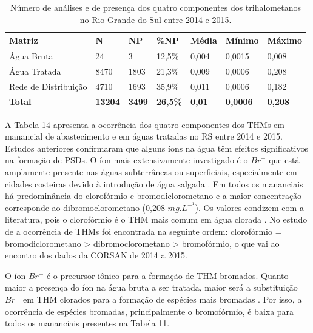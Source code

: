 \begin{table}[!htb]
\centering
\small
\caption{\small Número de análises e de presença dos quatro componentes dos trihalometanos  no Rio Grande do Sul entre 2014 e 2015.}
\label{tab:com_esp}
    \begin{tabular}{p{3.3cm}p{0.9cm}p{0.9cm}p{1cm}p{1cm}p{1.2cm}p{1.2cm}}
    \toprule
    \textbf{Matriz} & \textbf{N} & \textbf{NP}& \textbf {\%NP}&\textbf{Média} & \textbf{Mínimo} &\textbf{Máximo}\\ \hline
      Água Bruta   & 24 & 3 & 12,5\% & 0,004 & 0,0015 & 0,008 \\
      Água Tratada & 8470 & 1803 & 21,3\% & 0,009 & 0,0006 & 0,208\\
      Rede de Distribuição & 4710 & 1693 & 35,9\% & 0,011 & 0,0006 & 0,182\\ \hline
      \textbf{Total} & \textbf{13204} & \textbf{3499} & \textbf{26,5\%} & \textbf{0,01} & \textbf{0,0006} & \textbf{0,208} \\
      \bottomrule
    \end{tabular}
    \label{tab01}
\end{table}

\newpage
A Tabela 14 apresenta a ocorrência dos quatro componentes dos THMs em manancial de abastecimento e em águas tratadas no RS entre 2014 e 2015. 
Estudos anteriores confirmaram que alguns íons na água têm efeitos significativos na formação de PSDs. O íon mais extensivamente investigado é o $Br^-$ que está amplamente presente nas águas subterrâneas ou superficiais, especialmente em cidades costeiras devido à introdução de água salgada \cite{Nata2020}.  Em todos os mananciais há predominância do clorofórmio e bromodiclorometano e a maior concentração corresponde ao dibromoclorometano  (0,208 $mg.L^-^1$). Os valores condizem com a literatura, pois o clorofórmio é o THM mais comum em água clorada \cite{who2005}. No estudo de \cite{Abbas2014} a ocorrência de THMs foi encontrada na seguinte ordem: clorofórmio = bromodiclorometano > dibromoclorometano > bromofórmio, o que vai ao encontro dos dados da CORSAN de 2014 a 2015.

O íon $Br^-$ é o precursor iônico para a formação de THM bromados. Quanto maior a presença do íon na água bruta a ser tratada, maior será a substituição $Br^-$ em THM clorados para a formação de espécies mais bromadas \cite{Nata2020}. Por isso, a ocorrência de espécies bromadas, principalmente o bromofórmio, é baixa para todos os mananciais presentes na Tabela 11.




